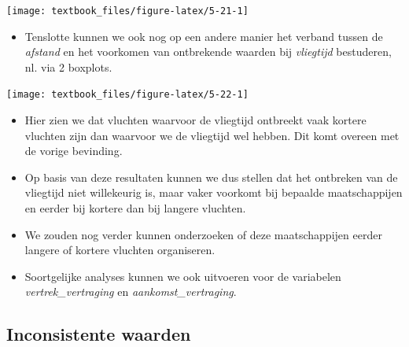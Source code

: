 \documentclass[]{tufte-book}
\providecommand{\tightlist}{%
  \setlength{\itemsep}{0pt}\setlength{\parskip}{0pt}}
\begin{document}
\texttt{[image: textbook\_files/figure-latex/5-21-1]}

\begin{itemize}
\tightlist
\item
  Tenslotte kunnen we ook nog op een andere manier het verband tussen de \emph{afstand} en het voorkomen van ontbrekende waarden bij \emph{vliegtijd} bestuderen, nl. via 2 boxplots.
\end{itemize}

\texttt{[image: textbook\_files/figure-latex/5-22-1]}

\begin{itemize}
\tightlist
\item
  Hier zien we dat vluchten waarvoor de vliegtijd ontbreekt vaak kortere vluchten zijn dan waarvoor we de vliegtijd wel hebben. Dit komt overeen met de vorige bevinding.
\item
  Op basis van deze resultaten kunnen we dus stellen dat het ontbreken van de vliegtijd niet willekeurig is, maar vaker voorkomt bij bepaalde maatschappijen en eerder bij kortere dan bij langere vluchten.
\item
  We zouden nog verder kunnen onderzoeken of deze maatschappijen eerder langere of kortere vluchten organiseren.
\item
  Soortgelijke analyses kunnen we ook uitvoeren voor de variabelen \emph{vertrek\_vertraging} en \emph{aankomst\_vertraging}.
\end{itemize}

\hypertarget{inconsistente-waarden}{%
\subsection{Inconsistente waarden}\label{inconsistente-waarden}}
\end{document}
